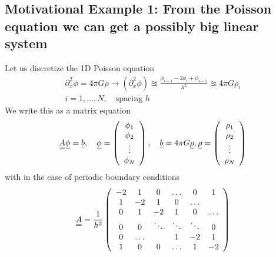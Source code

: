 \subsection{Motivational Example 1: From the Poisson equation we can get a possibly big linear system}
Let us discretize the 1D Poisson equation
\begin{equation}
    \begin{gathered}
        \partial_x^2 \phi = 4\pi G \rho \rightarrow (\partial_x^2\phi) \approxeq \frac{\phi_{i+1} - 2\phi_i + \phi_{i-1}}{h^2}  \approxeq  4\pi G \rho_i \\
        i = 1,\dots,N, \quad \text{spacing } h
    \end{gathered}
\end{equation}
We write this as a matrix equation
\begin{equation}
    \mat{A} \vec{\phi} = \vec{b}, \quad \vec{\phi} = \left( \begin{array}{c} \phi_1 \\ \phi_2 \\ \vdots \\ \phi_N \end{array} \right), \quad \vec{b} = 4\pi G \vec{\rho}, \vec{\rho} = \left( \begin{array}{c} \rho_1 \\ \rho_2 \\ \vdots \\ \rho_N \end{array} \right)
\end{equation}
with in the case of periodic boundary conditions
\begin{equation}
    \mat{A} = \frac{1}{h^2} \left( \begin{array}{cccccc}
            -2 & 1 & 0 & \dots & 0 & 1 \\
            1 & -2 & 1 & 0 & \dots &  \\
            0 & 1 & -2 & 1 & 0 & \dots \\
            0 & 0 & \ddots & \ddots & \ddots & 0 \\
            0 & \dots &  & 1 & -2 & 1 \\
            1 & 0 & 0 & \dots & 1 & -2
        \end{array} \right)
\end{equation}


